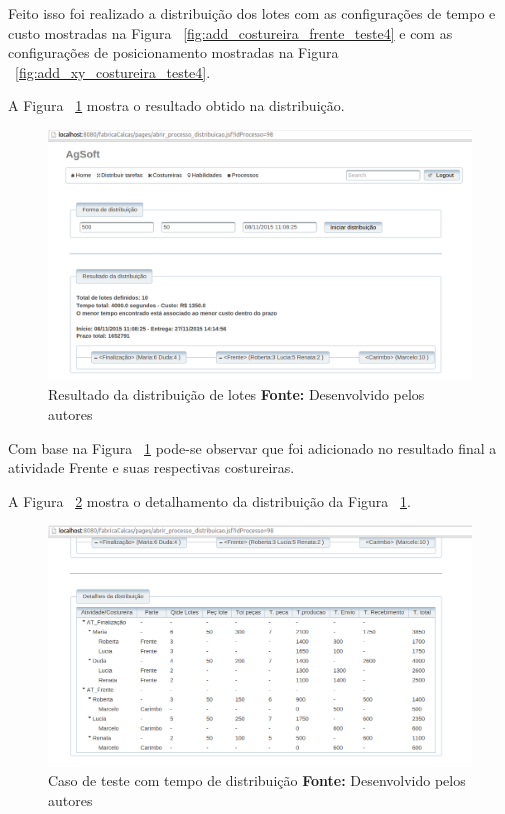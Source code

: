 \par Feito isso foi realizado a distribuição dos lotes com as configurações de
tempo e custo mostradas na Figura ~\ref{fig:add_costureira_frente_teste4} e com
as configurações de posicionamento mostradas na Figura
~\ref{fig:add_xy_costureira_teste4}.
\par A Figura ~\ref{fig:resultado1_teste5} mostra o resultado obtido na
distribuição.

\newpage

\begin{figure}[h!]
	\centerline{\includegraphics[scale=0.3]{./imagens/resultado1_teste5.png}}
	\caption[Resultado da distribuição de lotes]
	{Resultado da distribuição de lotes \textbf{Fonte:} Desenvolvido pelos autores}
	\label{fig:resultado1_teste5}
\end{figure}

\par Com base na Figura ~\ref{fig:resultado1_teste5} pode-se observar que foi
adicionado no resultado final a atividade Frente e suas respectivas costureiras.

\par A Figura ~\ref{fig:detalhamento1_teste5} mostra o detalhamento da
distribuição da Figura ~\ref{fig:resultado1_teste5}.

\begin{figure}[h!]
	\centerline{\includegraphics[scale=0.3]{./imagens/detalhamento1_teste5.png}}
	\caption[Distribuição das atividades]
	{Caso de teste com tempo de distribuição \textbf{Fonte:} Desenvolvido pelos autores}
	\label{fig:detalhamento1_teste5}
\end{figure}

